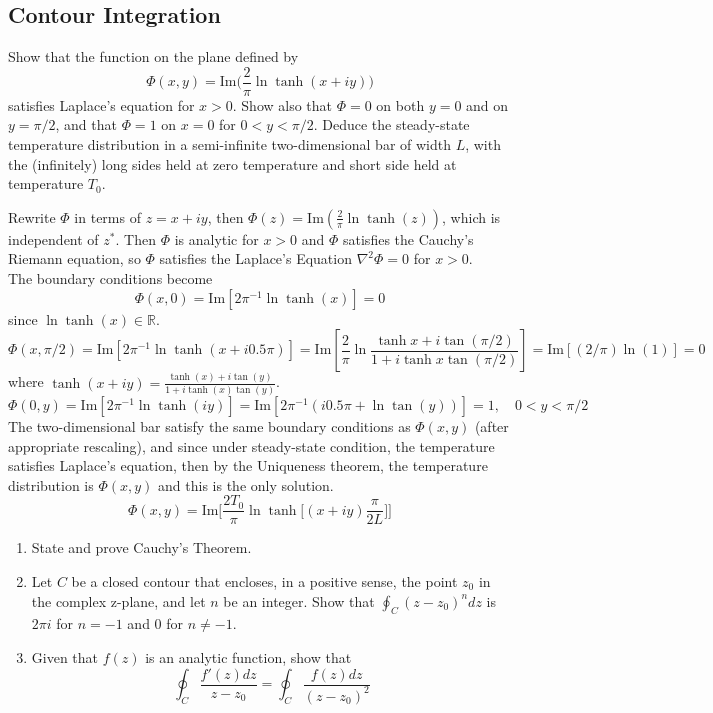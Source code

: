 \documentclass[a4paper]{article}
\begin{document}
\subsection*{Contour Integration}
\begin{qns}
Show that the function on the plane defined by
$$\Phi(x,y)=\text{Im}\bigg(\frac{2}{\pi}\ln\tanh(x+iy)\bigg)$$
satisfies Laplace's equation for $x>0$. Show also that $\Phi=0$ on both $y=0$ and on $y=\pi/2$, and that $\Phi=1$ on $x = 0$ for $0 < y < \pi/2$. Deduce the steady-state temperature distribution in a semi-infinite two-dimensional bar of width $L$, with the (infinitely) long sides held at zero temperature and short side held at temperature $T_0$.
\end{qns}
\begin{ans}
Rewrite $\Phi$ in terms of $z=x+iy$, then $\Phi(z)=\text{Im}(\frac{2}{\pi}\ln\tanh(z))$, which is independent of $z^*$. Then $\Phi$ is analytic for $x>0$ and $\Phi$ satisfies the Cauchy's Riemann equation, so $\Phi$ satisfies the Laplace's Equation $\nabla^2\Phi=0$ for $x>0$.\\[5pt]
The boundary conditions become $$\Phi(x,0)=\text{Im}[2\pi^{-1}\ln\tanh(x)]=0$$ since $\ln\tanh(x)\in\mathbb{R}$. $$\Phi(x,\pi/2)=\text{Im}[2\pi^{-1}\ln\tanh(x+i0.5\pi)]=\text{Im}[\frac{2}{\pi}\ln\frac{\tanh x+i\tan(\pi/2)}{1+i\tanh x\tan(\pi/2)}]=\text{Im}[(2/\pi)\ln(1)]=0$$
where $\tanh(x+iy)=\frac{\tanh(x)+i\tan(y)}{1+i\tanh(x)\tan(y)}$.  $$\Phi(0,y)=\text{Im}[2\pi^{-1}\ln\tanh(iy)]=\text{Im}[2\pi^{-1}(i0.5\pi+\ln\tan(y))]=1,\quad 0<y<\pi/2$$
The two-dimensional bar satisfy the same boundary conditions as $\Phi(x,y)$ (after appropriate rescaling), and since under steady-state condition, the temperature satisfies Laplace's equation, then by the Uniqueness theorem, the temperature distribution is $\Phi(x,y)$ and this is the only solution. 
$$\Phi(x,y)=\text{Im}\bigg[\frac{2T_0}{\pi}\ln\tanh\bigg[(x+iy)\frac{\pi}{2L}\bigg]\bigg]$$
\end{ans}
\newpage
\begin{qns}\leavevmode
\begin{enumerate}[label=(\roman*)]
\item State and prove Cauchy's Theorem.
\item Let $C$ be a closed contour that encloses, in a positive sense, the point $z_0$ in the complex z-plane, and let $n$ be an integer. Show that $\oint_C(z-z_0)^ndz$ is $2\pi i$ for $n=-1$ and 0 for $n\neq -1$.
\item Given that $f(z)$ is an analytic function, show that
$$\oint_C\frac{f'(z)dz}{z-z_0}=\oint_C\frac{f(z)dz}{(z-z_0)^2}$$
\end{enumerate}
\end{qns}
\end{document}
